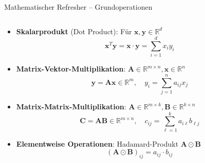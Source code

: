 \documentclass[aspectratio=1610, xcolor=dvipsnames, 9pt]{beamer}
\begin{document}
\begin{frame}{Mathematischer Refresher -- Grundoperationen}
  \begin{columns}
    \begin{column}{1\textwidth}
      \begin{itemize}
        \item \textbf{Skalarprodukt} (Dot Product): Für $\mathbf{x}, \mathbf{y} \in \mathbb{R}^d$
        \begin{equation}
          \mathbf{x}^T \mathbf{y} = \mathbf{x} \cdot \mathbf{y} = \sum_{i=1}^{d} x_i y_i
        \end{equation}
        \item \textbf{Matrix-Vektor-Multiplikation}: $\mathbf{A} \in \mathbb{R}^{m \times n}, \mathbf{x} \in \mathbb{R}^n$
        \begin{equation}
          \mathbf{y} = \mathbf{A}\mathbf{x} \in \mathbb{R}^m, \quad y_i = \sum_{j=1}^{n} a_{ij} x_j
        \end{equation}
        \item \textbf{Matrix-Matrix-Multiplikation}: $\mathbf{A} \in \mathbb{R}^{m \times k}, \mathbf{B} \in \mathbb{R}^{k \times n}$
        \begin{equation}
          \mathbf{C} = \mathbf{A}\mathbf{B} \in \mathbb{R}^{m \times n}, \quad c_{ij} = \sum_{\ell=1}^{k} a_{i\ell} b_{\ell j}
        \end{equation}
        \item \textbf{Elementweise Operationen}: Hadamard-Produkt $\mathbf{A} \odot \mathbf{B}$
        \begin{equation}
          (\mathbf{A} \odot \mathbf{B})_{ij} = a_{ij} \cdot b_{ij}
        \end{equation}
      \end{itemize}
    \end{column}
  \end{columns}
\end{frame}
\end{document}
